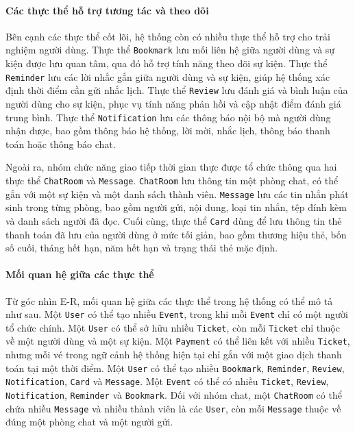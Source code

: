 \documentclass[../DoAn.tex]{subfiles}
\begin{document}
\paragraph{Các thực thể hỗ trợ tương tác và theo dõi}\mbox{}

Bên cạnh các thực thể cốt lõi, hệ thống còn có nhiều thực thể hỗ trợ cho trải nghiệm người dùng. Thực thể \texttt{Bookmark} lưu mối liên hệ giữa người dùng và sự kiện được lưu quan tâm, qua đó hỗ trợ tính năng theo dõi sự kiện. Thực thể \texttt{Reminder} lưu các lời nhắc gắn giữa người dùng và sự kiện, giúp hệ thống xác định thời điểm cần gửi nhắc lịch. Thực thể \texttt{Review} lưu đánh giá và bình luận của người dùng cho sự kiện, phục vụ tính năng phản hồi và cập nhật điểm đánh giá trung bình. Thực thể \texttt{Notification} lưu các thông báo nội bộ mà người dùng nhận được, bao gồm thông báo hệ thống, lời mời, nhắc lịch, thông báo thanh toán hoặc thông báo chat.

Ngoài ra, nhóm chức năng giao tiếp thời gian thực được tổ chức thông qua hai thực thể \texttt{ChatRoom} và \texttt{Message}. \texttt{ChatRoom} lưu thông tin một phòng chat, có thể gắn với một sự kiện và một danh sách thành viên. \texttt{Message} lưu các tin nhắn phát sinh trong từng phòng, bao gồm người gửi, nội dung, loại tin nhắn, tệp đính kèm và danh sách người đã đọc. Cuối cùng, thực thể \texttt{Card} dùng để lưu thông tin thẻ thanh toán đã lưu của người dùng ở mức tối giản, bao gồm thương hiệu thẻ, bốn số cuối, tháng hết hạn, năm hết hạn và trạng thái thẻ mặc định.

\paragraph{Mối quan hệ giữa các thực thể}\mbox{}

Từ góc nhìn E-R, mối quan hệ giữa các thực thể trong hệ thống có thể mô tả như sau. Một \texttt{User} có thể tạo nhiều \texttt{Event}, trong khi mỗi \texttt{Event} chỉ có một người tổ chức chính. Một \texttt{User} có thể sở hữu nhiều \texttt{Ticket}, còn mỗi \texttt{Ticket} chỉ thuộc về một người dùng và một sự kiện. Một \texttt{Payment} có thể liên kết với nhiều \texttt{Ticket}, nhưng mỗi vé trong ngữ cảnh hệ thống hiện tại chỉ gắn với một giao dịch thanh toán tại một thời điểm. Một \texttt{User} có thể tạo nhiều \texttt{Bookmark}, \texttt{Reminder}, \texttt{Review}, \texttt{Notification}, \texttt{Card} và \texttt{Message}. Một \texttt{Event} có thể có nhiều \texttt{Ticket}, \texttt{Review}, \texttt{Notification}, \texttt{Reminder} và \texttt{Bookmark}. Đối với nhóm chat, một \texttt{ChatRoom} có thể chứa nhiều \texttt{Message} và nhiều thành viên là các \texttt{User}, còn mỗi \texttt{Message} thuộc về đúng một phòng chat và một người gửi.
\end{document}
